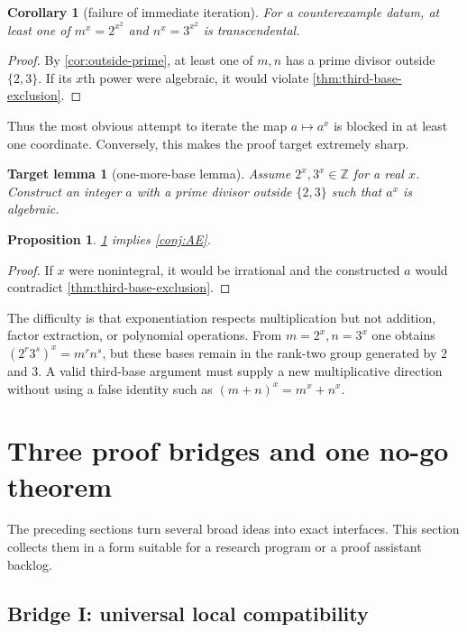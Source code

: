 \documentclass[11pt,oneside]{article}
\newtheorem{proposition}[theorem]{Proposition}
\newtheorem{corollary}[theorem]{Corollary}
\newtheorem{target}[theorem]{Target lemma}
\theoremstyle{definition}
\theoremstyle{remark}
\newcommand{\Z}{\mathbb{Z}}
\begin{document}
\begin{corollary}[failure of immediate iteration]\label{cor:iteration-fails}
For a counterexample datum, at least one of $m^x=2^{x^2}$ and
$n^x=3^{x^2}$ is transcendental.
\end{corollary}

\begin{proof}
By \cref{cor:outside-prime}, at least one of $m,n$ has a prime divisor outside
$\{2,3\}$.  If its $x$th power were algebraic, it would violate
\cref{thm:third-base-exclusion}.
\end{proof}

Thus the most obvious attempt to iterate the map $a\mapsto a^x$ is blocked in
at least one coordinate.  Conversely, this makes the proof target extremely
sharp.

\begin{target}[one-more-base lemma]\label{target:one-more-base}
Assume $2^x,3^x\in\Z$ for a real $x$.  Construct an integer
$a$ with a prime divisor outside $\{2,3\}$ such that $a^x$ is algebraic.
\end{target}

\begin{proposition}
\cref{target:one-more-base} implies \cref{conj:AE}.
\end{proposition}

\begin{proof}
If $x$ were nonintegral, it would be irrational and the constructed $a$
would contradict \cref{thm:third-base-exclusion}.
\end{proof}

The difficulty is that exponentiation respects multiplication but not
addition, factor extraction, or polynomial operations.  From
$m=2^x,n=3^x$ one obtains $(2^r3^s)^x=m^rn^s$, but these bases remain in the
rank-two group generated by $2$ and $3$.  A valid third-base argument must
supply a new multiplicative direction without using a false identity such as
$(m+n)^x=m^x+n^x$.

\section{Three proof bridges and one no-go theorem}\label{sec:bridges}

The preceding sections turn several broad ideas into exact interfaces.  This
section collects them in a form suitable for a research program or a proof
assistant backlog.

\subsection{Bridge I: universal local compatibility}
\end{document}
